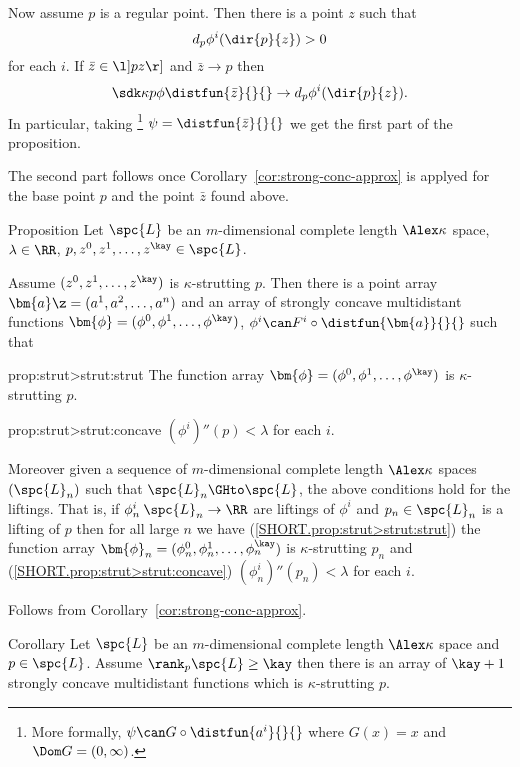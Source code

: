 Now assume $p$ is a regular point. 
Then there is a point $z$ such that 
\[d_p\phi^i(\dir{p}{z})>0\]
for each $i$.
If $\bar z\in\l]pz\r]$ and $\bar z\to p$
then
\[\sdk\kappa p{\phi}{\distfun{\bar z}{}{}}\to d_p\phi^i(\dir{p}{z}).\]
In particular, 
taking%
\footnote{More formally, $\psi\can G\circ\distfun{a^i}{}{}$ where $G(x)=x$ and $\Dom G=(0,\infty)$.} $\psi=\distfun{\bar z}{}{}$ we get the first part of the proposition. 

The second part follows once Corollary~\ref{cor:strong-conc-approx} is applyed for the base point $p$ and the point $\bar z$ found above.
\qeds

\begin{thm}{Proposition}\label{prop:strut>strut}
Let $\spc{L}$ be an $m$-dimensional complete length $\Alex\kappa$ space,
$\lambda\in\RR$,
$p,z^0,z^1,\dots,z^\kay\in \spc{L}$.

Assume $(z^0,z^1,\dots,z^\kay)$ is $\kappa$-strutting $p$.
Then there is a point array
$\bm{a}\z=(a^1,a^2,\dots, a^{n})$
and an array of strongly concave multidistant functions 
$\bm{\phi}=(\phi^0,\phi^1,\dots,\phi^\kay)$, 
$\phi^i\can F^i\circ\distfun{\bm{a}}{}{}$
such that 

\begin{subthm}{prop:strut>strut:strut}
The function array $\bm{\phi}=(\phi^0,\phi^1,\dots,\phi^\kay)$ is $\kappa$-strutting $p$.
\end{subthm}

\begin{subthm}{prop:strut>strut:concave}
$(\phi^i)''(p)<\lambda$ for each $i$.
\end{subthm}

Moreover given a sequence of  $m$-dimensional complete length $\Alex\kappa$ spaces $(\spc{L}_n)$
such that $\spc{L}_n\GHto \spc{L}$,
the above conditions hold for the liftings.
That is, if $\phi_n^i\:\spc{L}_n\to\RR$ 
are liftings of $\phi^i$ 
and $p_n\in \spc{L}_n$ is a lifting of $p$
then 
for all large $n$ we have
(\ref{SHORT.prop:strut>strut:strut})
the function array $\bm{\phi}_n=(\phi_n^0,\phi_n^1,\dots,\phi_n^\kay)$ is $\kappa$-strutting $p_n$
and 
(\ref{SHORT.prop:strut>strut:concave}) $(\phi_n^i)''(p_n)<\lambda$ for each $i$.
\end{thm}

Follows from Corollary~\ref{cor:strong-conc-approx}.
\qeds

\begin{thm}{Corollary}
Let $\spc{L}$ be an $m$-dimensional complete length $\Alex\kappa$ space and $p\in  \spc{L}$.
Assume $\rank_p\spc{L}\ge \kay$
then there is an array 
of $\kay+1$ strongly concave
multidistant functions which is $\kappa$-strutting $p$.
\end{thm}

